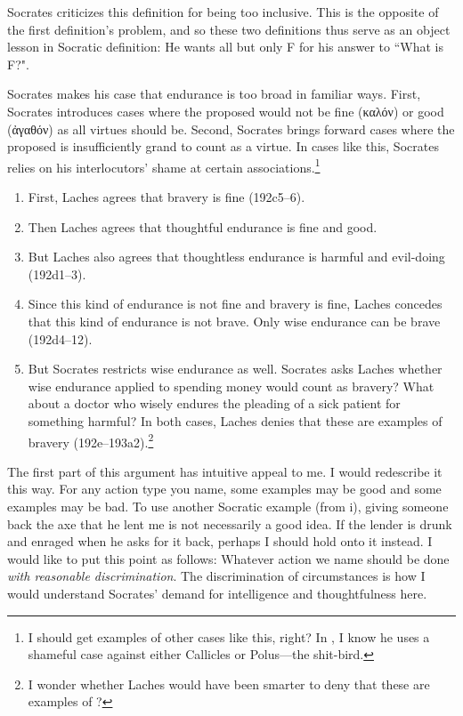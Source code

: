 \documentclass[11pt]{article}
\begin{document}
Socrates criticizes this definition for being too inclusive.  This is the opposite of the first definition's problem, and so these two definitions thus serve as an object lesson in Socratic definition: He wants all but only F for his answer to ``What is F?".

Socrates makes his case that endurance is too broad in familiar ways.  First, Socrates introduces cases where the proposed  would not be fine (καλόν) or good (ἀγαθόν) as all virtues should be. Second, Socrates brings forward cases where the proposed  is insufficiently grand to count as a virtue.  In cases like this, Socrates relies on his interlocutors' shame at certain associations.\footnote{I should get examples of other cases like this, right?  In , I know he uses a shameful case against either Callicles or Polus---the shit-bird.}

\begin{enumerate}
    \item First, Laches agrees that bravery is fine (192c5--6).
    \item Then Laches agrees that thoughtful endurance is fine and good.
    \item But Laches also agrees that thoughtless endurance is harmful and evil-doing (192d1--3).
    \item Since this kind of endurance is not fine and bravery is fine, Laches concedes that this kind of endurance is not brave.  Only wise endurance can be brave (192d4--12).
    \item But Socrates restricts wise endurance as well.  Socrates asks Laches whether wise endurance applied to spending money would count as bravery?  What about a doctor who wisely endures the pleading of a sick patient for something harmful?  In both cases, Laches denies that these are examples of bravery (192e--193a2).\footnote{I wonder whether Laches would have been smarter to deny that these are examples of ?}
\end{enumerate}

The first part of this argument has intuitive appeal to me.  I would redescribe it this way.  For any action type you name, some examples may be good and some examples may be bad.  To use another Socratic example (from  i), giving someone back the axe that he lent me is not necessarily a good idea.  If the lender is drunk and enraged when he asks for it back, perhaps I should hold onto it instead.  I would like to put this point as follows: Whatever action we name should be done \emph{with reasonable discrimination}.  The discrimination of circumstances is how I would understand Socrates' demand for intelligence and thoughtfulness here.
\end{document}
